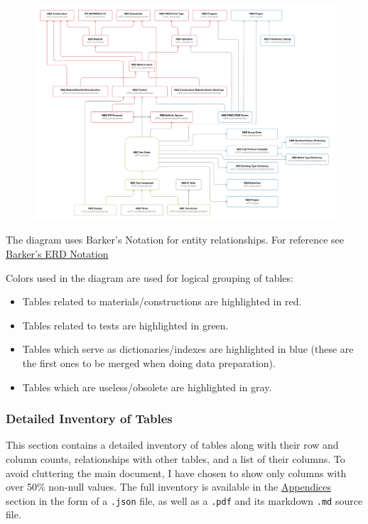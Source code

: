 \begin{figure}[h!]
\centering
\includegraphics[width=\textwidth]{PDFs/er_diagram.pdf}
\end{figure}

The diagram uses Barker's Notation for entity relationships. For reference see \href{https://ece.uprm.edu/~icom5047/documents/barkers-erd-notation.pdf}{Barker's ERD Notation}

Colors used in the diagram are used for logical grouping of tables:
\begin{itemize}
    \item Tables related to \textcolor[HTML]{cc3e44}{materials/constructions} are highlighted in \textcolor[HTML]{cc3e44}{red}.
    \item Tables related to \textcolor[HTML]{8dc149}{tests} are highlighted in \textcolor[HTML]{8dc149}{green}.
    \item Tables which serve as \textcolor[HTML]{519aba}{dictionaries/indexes} are highlighted in \textcolor[HTML]{519aba}{blue} (these are the first ones to be merged when doing data preparation).
    \item Tables which are \textcolor[HTML]{808080}{useless/obsolete} are highlighted in \textcolor[HTML]{808080}{gray}.
\end{itemize}



\subsubsection{Detailed Inventory of Tables}

This section contains a detailed inventory of tables along with their row and column counts, relationships with other tables, and a list of their columns. To avoid cluttering the main document, I have chosen to show only columns with over 50\% non-null values. The full inventory is available in the \hyperref[sec:Appendices]{Appendices} section in the form of a \texttt{.json} file, as well as a \texttt{.pdf} and its markdown \texttt{.md} source file.


